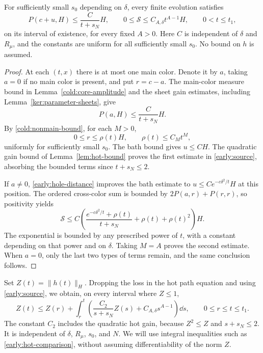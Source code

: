 \begin{lemma}\label{early:source-estimates}
For sufficiently small $s_0$ depending on $\delta$, every finite evolution
satisfies
\begin{equation}\label{early:source}
 P(c+u,H)\le\frac{C}{t+s_N}H,
 \qquad
 0\le\mathcal S\le C_{A,\delta}t^{A-1}H,
 \qquad 0<t\le t_1,
\end{equation}
on its interval of existence, for every fixed $A>0$.
Here $C$ is independent of $\delta$ and $R_\mu$, and the constants are
uniform for all sufficiently small $s_0$. No bound on $h$ is assumed.
\end{lemma}

\begin{proof}
At each $(t,x)$ there is at most one main color. Denote it by $a$, taking
$a=0$ if no main color is present, and put $r=c-a$.
The main-color measure bound in Lemma~\ref{cold:core-amplitude} and the sheet
gain estimates, including Lemma~\ref{ker:parameter-sheets}, give
\[
 P(a,H)\le\frac{C}{t+s_N}H.
\]
By \eqref{cold:nonmain-bound}, for each $M>0$,
\[
 0\le r\le\rho(t)H,\qquad \rho(t)\le C_Mt^M,
\]
uniformly for sufficiently small $s_0$. The bath bound gives $u\le CH$.
The quadratic gain bound of Lemma~\ref{lem:hot-bound} proves the first
estimate in \eqref{early:source}, absorbing the bounded terms since
$t+s_N\le2$.

If $a\ne0$, \eqref{early:hole-distance} improves the bath estimate to
$u\le C e^{-c\delta^2/t}H$ at this position. The ordered cross-color sum
is bounded by $2P(a,r)+P(r,r)$, so positivity yields
\[
 \mathcal S\le
 C\left(\frac{e^{-c\delta^2/t}+\rho(t)}{t+s_N}
                 +\rho(t)+\rho(t)^2\right)H.
\]
The exponential is bounded by any prescribed power of $t$, with a
constant depending on that power and on $\delta$. Taking $M=A$ proves
the second estimate. When $a=0$, only the last two types of terms remain,
and the same conclusion follows.
\end{proof}

Set $Z(t)=\|h(t)\|_H$. Dropping the loss in the hot path equation and
using \eqref{early:source}, we obtain, on every interval where $Z\le1$,
\begin{equation}\label{early:hot-comparison}
 Z(t)\le Z(r)+\int_r^t\left(
       \frac{C_2}{s+s_N}Z(s)+C_{A,\delta}s^{A-1}\right)\dd s,
 \qquad 0\le r\le t\le t_1.
\end{equation}
The constant $C_2$ includes the quadratic hot gain, because $Z^2\le Z$
and $s+s_N\le2$. It is independent of $\delta$, $R_\mu$, $s_0$, and $N$.
We will use integral inequalities such as \eqref{early:hot-comparison},
without assuming differentiability of the norm $Z$.

